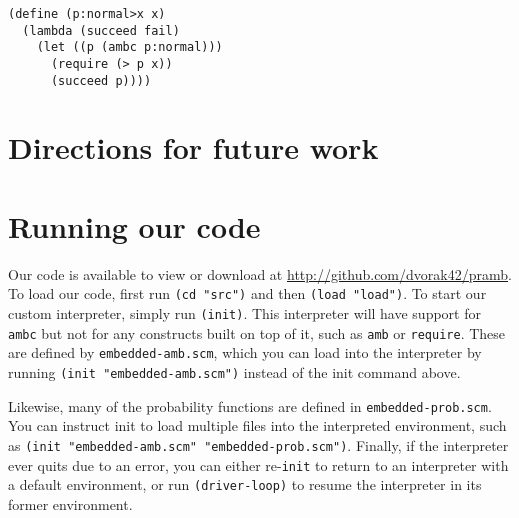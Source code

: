 \documentclass{article}
\begin{document}
\begin{lstlisting}
(define (p:normal>x x)
  (lambda (succeed fail)
    (let ((p (ambc p:normal)))
      (require (> p x))
      (succeed p))))
\end{lstlisting}

\section{Directions for future work}

\appendix

\section{Running our code}

Our code is available to view or download at
\url{http://github.com/dvorak42/pramb}. To load our code, first run
\texttt{(cd "src")} and then \texttt{(load "load")}. To start our
custom interpreter, simply run \texttt{(init)}. This interpreter will
have support for \texttt{ambc} but not for any constructs built on top
of it, such as \texttt{amb} or \texttt{require}. These are defined by
\texttt{embedded-amb.scm}, which you can load into the interpreter by
running \texttt{(init "embedded-amb.scm")} instead of the init command
above.

Likewise, many of the probability functions are defined in
\texttt{embedded-prob.scm}. You can instruct init to load multiple
files into the interpreted environment, such as \texttt{(init
  "embedded-amb.scm" "embedded-prob.scm")}. Finally, if the
interpreter ever quits due to an error, you can either
re-\texttt{init} to return to an interpreter with a default
environment, or run \texttt{(driver-loop)} to resume the interpreter
in its former environment.
\end{document}

